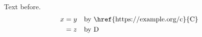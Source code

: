\documentclass{article}
\begin{document}
Text before.
\begin{align}
x& = y && \text{by \href{https://example.org/c}{C}}\\
 & = z && \text{by D}
\end{align}
\end{document}
